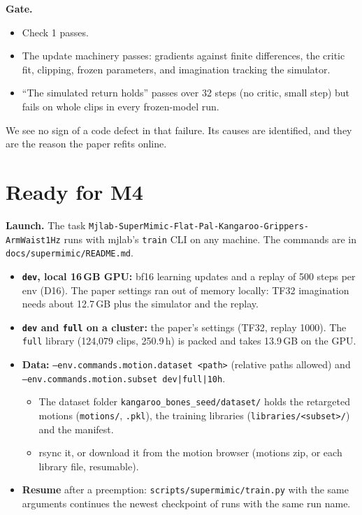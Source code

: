 \documentclass[10pt]{article}
\begin{document}
\textbf{Gate.}
\begin{itemize}
  \item Check 1 passes.
  \item The update machinery passes: gradients against finite differences, the critic fit, clipping,
  frozen parameters, and imagination tracking the simulator.
  \item ``The simulated return holds'' passes over 32 steps (no critic, small step) but fails on whole
  clips in every frozen-model run.
\end{itemize}
We see no sign of a code defect in that failure. Its causes are identified, and they are the reason
the paper refits online.

\section{Ready for M4}
\label{sec:m4}

\textbf{Launch.} The task \texttt{Mjlab-SuperMimic-Flat-Pal-Kangaroo-Grippers-ArmWaist1Hz} runs with
mjlab's \texttt{train} CLI on any machine. The commands are in \texttt{docs/supermimic/README.md}.
\begin{itemize}
  \item \textbf{\texttt{dev}, local 16\,GB GPU:} bf16 learning updates and a replay of 500 steps per
  env (D16). The paper settings ran out of memory locally: TF32 imagination needs about 12.7\,GB plus
  the simulator and the replay.
  \item \textbf{\texttt{dev} and \texttt{full} on a cluster:} the paper's settings (TF32, replay 1000).
  The \texttt{full} library (124,079 clips, 250.9\,h) is packed and takes 13.9\,GB on the GPU.
  \item \textbf{Data:} \texttt{--env.commands.motion.dataset <path>} (relative paths allowed) and
  \texttt{--env.commands.motion.subset dev|full|10h}.
  \begin{itemize}
    \item The dataset folder \texttt{kangaroo\_bones\_seed/dataset/} holds the retargeted motions
    (\texttt{motions/}, \texttt{.pkl}), the training libraries (\texttt{libraries/<subset>/}) and the
    manifest.
    \item rsync it, or download it from the motion browser (motions zip, or each library file,
    resumable).
  \end{itemize}
  \item \textbf{Resume} after a preemption: \texttt{scripts/supermimic/train.py} with the same
  arguments continues the newest checkpoint of runs with the same run name.
\end{itemize}
\end{document}
